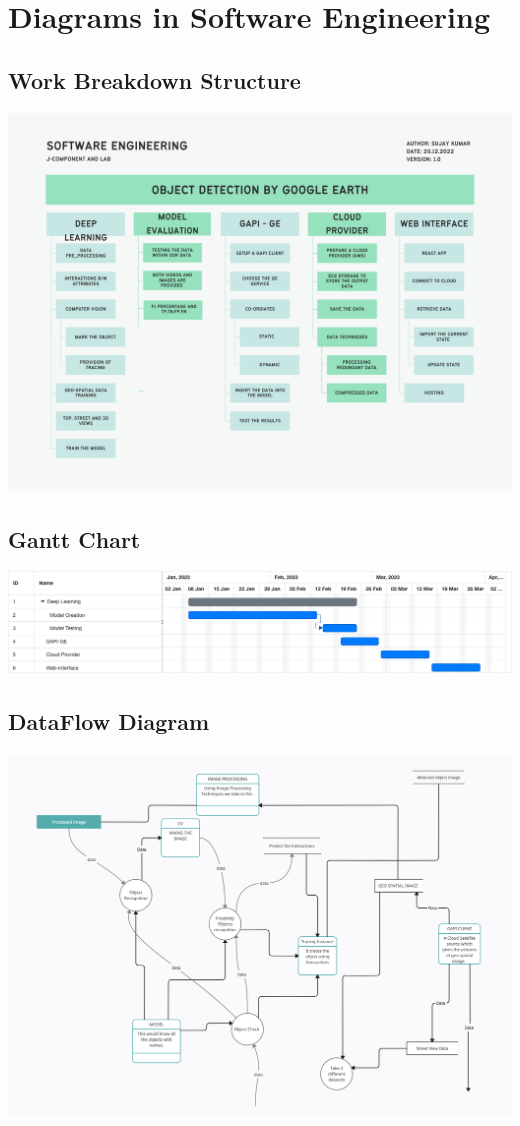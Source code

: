 \chapter{Diagrams in Software Engineering}
\section{Work Breakdown Structure}
\includegraphics[scale=0.6]{images/wbs.pdf}
\section{Gantt Chart}
\includegraphics[scale=0.4]{images/gantt.png}
\section{DataFlow Diagram}
\includegraphics[scale=0.6]{images/dfd.png}
